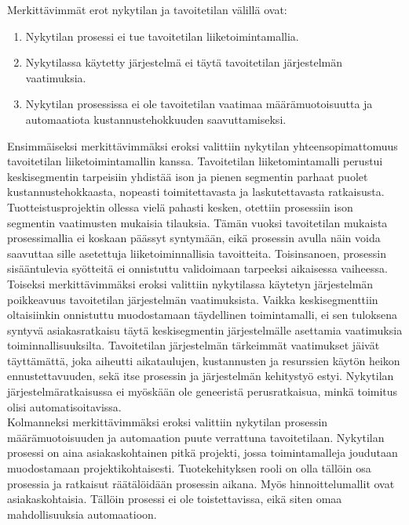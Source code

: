 \documentclass[finnish,12pt,a4paper,pdftex]{article}
\begin{document}
\noindent Merkittävimmät erot nykytilan ja tavoitetilan välillä ovat:
\begin{enumerate}
    \item Nykytilan prosessi ei tue tavoitetilan liiketoimintamallia.
    \item Nykytilassa käytetty järjestelmä ei täytä tavoitetilan järjestelmän vaatimuksia.
    \item Nykytilan prosessissa ei ole tavoitetilan vaatimaa määrämuotoisuutta ja automaatiota kustannustehokkuuden saavuttamiseksi.
\end{enumerate}

Ensimmäiseksi merkittävimmäksi eroksi valittiin nykytilan yhteensopimattomuus tavoitetilan liiketoimintamallin kanssa. Tavoitetilan liiketomintamalli perustui keskisegmentin tarpeisiin yhdistää ison ja pienen segmentin parhaat puolet kustannustehokkaasta, nopeasti toimitettavasta ja laskutettavasta ratkaisusta. Tuotteistusprojektin ollessa vielä pahasti kesken, otettiin prosessiin ison segmentin vaatimusten mukaisia tilauksia. Tämän vuoksi tavoitetilan mukaista prosessimallia ei koskaan päässyt syntymään, eikä prosessin avulla näin voida saavuttaa sille asetettuja liiketoiminnallisia tavoitteita. Toisinsanoen, prosessin sisääntulevia syötteitä ei onnistuttu validoimaan tarpeeksi aikaisessa vaiheessa.\\

\noindent Toiseksi merkittävimmäksi eroksi valittiin nykytilassa käytetyn järjestelmän poikkeavuus tavoitetilan järjestelmän vaatimuksista. Vaikka keskisegmenttiin oltaisiinkin onnistuttu muodostamaan täydellinen toimintamalli, ei sen tuloksena syntyvä asiakasratkaisu täytä keskisegmentin järjestelmälle asettamia vaatimuksia toiminnallisuuksilta. Tavoitetilan järjestelmän tärkeimmät vaatimukset jäivät täyttämättä, joka aiheutti aikataulujen, kustannusten ja resurssien käytön heikon ennustettavuuden, sekä itse prosessin ja järjestelmän kehitystyö estyi. Nykytilan järjestelmäratkaisussa ei myöskään ole geneeristä perusratkaisua, minkä toimitus olisi automatisoitavissa.\\

\noindent Kolmanneksi merkittävimmäksi eroksi valittiin nykytilan prosessin määrämuotoisuuden ja automaation puute verrattuna tavoitetilaan. Nykytilan prosessi on aina asiakaskohtainen pitkä projekti, jossa toimintamalleja joudutaan muodostamaan projektikohtaisesti. Tuotekehityksen rooli on olla tällöin osa prosessia ja ratkaisut räätälöidään prosessin aikana. Myös hinnoittelumallit ovat asiakaskohtaisia. Tällöin prosessi ei ole toistettavissa, eikä siten omaa mahdollisuuksia automaatioon.\\
\end{document}
